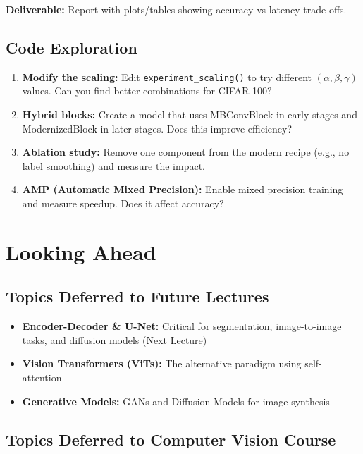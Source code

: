 \documentclass{article}
\begin{document}
\textbf{Deliverable:} Report with plots/tables showing accuracy vs latency trade-offs.

\subsection{Code Exploration}

\begin{enumerate}
    \item \textbf{Modify the scaling:} Edit \texttt{experiment\_scaling()} to try different $(\alpha, \beta, \gamma)$ values. Can you find better combinations for CIFAR-100?
    
    \item \textbf{Hybrid blocks:} Create a model that uses MBConvBlock in early stages and ModernizedBlock in later stages. Does this improve efficiency?
    
    \item \textbf{Ablation study:} Remove one component from the modern recipe (e.g., no label smoothing) and measure the impact.
    
    \item \textbf{AMP (Automatic Mixed Precision):} Enable mixed precision training and measure speedup. Does it affect accuracy?
\end{enumerate}

\section{Looking Ahead}

\subsection{Topics Deferred to Future Lectures}

\begin{itemize}
    \item \textbf{Encoder-Decoder \& U-Net:} Critical for segmentation, image-to-image tasks, and diffusion models (Next Lecture)
    
    \item \textbf{Vision Transformers (ViTs):} The alternative paradigm using self-attention
    
    \item \textbf{Generative Models:} GANs and Diffusion Models for image synthesis
\end{itemize}

\subsection{Topics Deferred to Computer Vision Course}
\end{document}
